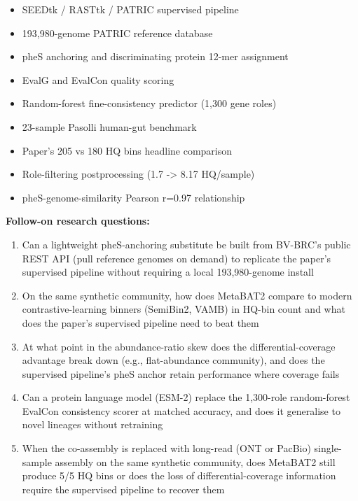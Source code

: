 \documentclass[11pt]{article}
\begin{document}
\begin{itemize}[leftmargin=1.4em,itemsep=0.2em,topsep=0.2em]
\item SEEDtk / RASTtk / PATRIC supervised pipeline
\item 193,980-genome PATRIC reference database
\item pheS anchoring and discriminating protein 12-mer assignment
\item EvalG and EvalCon quality scoring
\item Random-forest fine-consistency predictor (1,300 gene roles)
\item 23-sample Pasolli human-gut benchmark
\item Paper's 205 vs 180 HQ bins headline comparison
\item Role-filtering postprocessing (1.7 -\textgreater{} 8.17 HQ/sample)
\item pheS-genome-similarity Pearson r=0.97 relationship
\end{itemize}\noindent\textbf{Follow-on research questions:}
\begin{enumerate}[leftmargin=1.6em,itemsep=0.2em,topsep=0.2em,label=Q\arabic*.]
\item Can a lightweight pheS-anchoring substitute be built from BV-BRC's public REST API (pull reference genomes on demand) to replicate the paper's supervised pipeline without requiring a local 193,980-genome install
\item On the same synthetic community, how does MetaBAT2 compare to modern contrastive-learning binners (SemiBin2, VAMB) in HQ-bin count and what does the paper's supervised pipeline need to beat them
\item At what point in the abundance-ratio skew does the differential-coverage advantage break down (e.g., flat-abundance community), and does the supervised pipeline's pheS anchor retain performance where coverage fails
\item Can a protein language model (ESM-2) replace the 1,300-role random-forest EvalCon consistency scorer at matched accuracy, and does it generalise to novel lineages without retraining
\item When the co-assembly is replaced with long-read (ONT or PacBio) single-sample assembly on the same synthetic community, does MetaBAT2 still produce 5/5 HQ bins or does the loss of differential-coverage information require the supervised pipeline to recover them
\end{enumerate}
\end{document}
